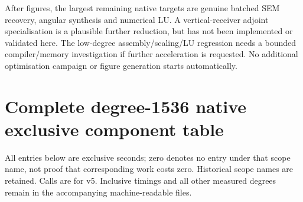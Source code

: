 \documentclass[11pt,a4paper]{article}
\begin{document}
After figures, the largest remaining native targets are genuine batched SEM recovery, angular synthesis and numerical LU. A vertical-receiver adjoint specialisation is a plausible further reduction, but has not been implemented or validated here. The low-degree assembly/scaling/LU regression needs a bounded compiler/memory investigation if further acceleration is requested. No additional optimisation campaign or figure generation starts automatically.
\clearpage
\appendix
\section{Complete degree-1536 native exclusive component table}
All entries below are exclusive seconds; zero denotes no entry under that scope name, not proof that corresponding work costs zero. Historical scope names are retained. Calls are for v5. Inclusive timings and all other measured degrees remain in the accompanying machine-readable files.
\begingroup\scriptsize
\end{document}
